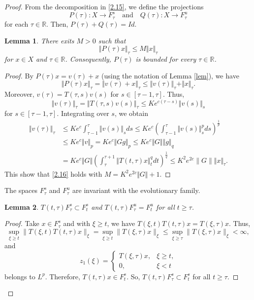 \documentclass[reqno]{amsart}
\newtheorem{lemma}{Lemma}[section]
\def\r{\mathbb{R}}
\begin{document}
\begin{proof}
From the decomposition in \eqref{2.15}, we define the projections
$$ P(\tau):X \rightarrow F^s_{\tau} \quad \text{and} \quad  Q(\tau):X\rightarrow F^u_{\tau}$$
for each $\tau \in \r$. Then,  $P(\tau)+Q(\tau)=Id$.
 \begin{lemma}
There exits $M>0$ such that
\begin{equation}
\Vert P(\tau)x\Vert _\tau \leq M\Vert x\Vert_\tau   \label{2.16}
\end{equation} 
for $x \in X$ and $\tau \in \mathbb{R}$. Consequently, $P(\tau)$ is bounded for every $\tau \in \r$.         
\end{lemma}
\begin{proof}
By  $P(\tau)x  =v(\tau)+x$ (using the notation of Lemma \ref{lem}), we have
 $$\Vert P(\tau)x\Vert _{\tau}=\Vert v(\tau)+x \Vert _{\tau} \leq \Vert v(\tau)\Vert _{\tau}+\Vert x\Vert _{\tau}.$$ 
Moreover, $v(\tau)=T(\tau,s)v(s)$ for $s \in [\tau -1, \tau]$. Thus, 
$$ \Vert v(\tau)\Vert _{\tau}=\Vert T(\tau,s)v(s)\Vert _{\tau}
 \leq Ke^{c(\tau-s)}\Vert v(s)\Vert _s$$ for $s\in [\tau -1, \tau]$. Integrating over $s$, we obtain
 \begin{align*}
\Vert v(\tau)\Vert _{\tau}
 &\leq Ke^{c}\displaystyle\int_{\tau -1}^{\tau}\Vert v(s)\Vert _s ds
 \leq  Ke^{c}\left(\displaystyle\int_{\tau -1}^{\tau}\Vert v(s)\Vert _s^p ds\right)^{\frac{1}{p}}\\
 &\leq Ke^{c} \Vert v\Vert _p=Ke^c\Vert Gg\Vert _p
 \leq Ke^c \Vert G\Vert \Vert g\Vert _q\\
&=Ke^c\Vert G\Vert \left(\displaystyle\int_{\tau }^{\tau +1}\Vert T(t,\tau)x\Vert _{t}^q dt\right)^{\frac{1}{q}} 
\leq K^2e^{2c} \|G\| \Vert x \Vert _{\tau}.
\end{align*}
This show that \eqref{2.16} holds with $M=K^2e^{2c}\Vert G\Vert +1$.
\end{proof}
The spaces $F_{\tau}^s$ and $F_{\tau}^u$ are invariant with the evolutionary family.
\begin{lemma}\label{lem3}
$T(t,\tau)F_{\tau}^s \subset F_{t}^s$ and $T(t,\tau)F_{\tau}^u = F_{t}^u$ for all $t\ge \tau$.
\end{lemma}
\begin{proof}
Take $x\in F^{s}_{\tau}$ and with $\xi \ge t$, we have $T(\xi, t)T(t,\tau)x = T(\xi, \tau)x$. Thus,
$$ \sup_{\xi \ge t}\|T(\xi, t)T(t,\tau)x\|_{\xi} = \sup_{\xi \ge t} \|T(\xi, \tau)x\|_{\xi} \le \sup_{\xi \ge \tau} \|T(\xi, \tau)x\|_{\xi} <\infty, $$
and
$$ 
z_1(\xi)=
\begin{cases}
T(\xi, \tau)x,& \xi \ge t,\\
0,&\xi < t
\end{cases}
 $$
belongs to $L^p$.
Therefore, $T(t,\tau)x \in F^{s}_t$.
So, $ T(t,\tau) F^{s}_{\tau} \subset  F^{s}_t$ for all $t\ge \tau$.


\end{proof}
\end{proof}
\end{document}
